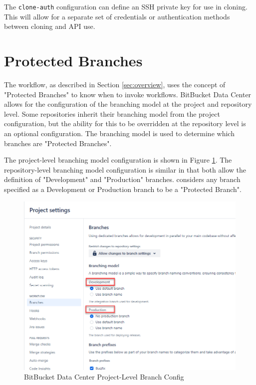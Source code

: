 The \texttt{clone-auth} configuration can define an SSH private key for use in cloning.  This
will allow for a separate set of credentials or authentication methods between cloning and
API use.


\section{Protected Branches}

The \cxoneflow workflow, as described in Section \ref{sec:overview}, uses the concept of "Protected Branches"
to know when to invoke workflows.  BitBucket Data Center allows for the configuration of the branching model
at the project and repository level.  Some repositories inherit their branching model from the project
configuration, but the ability for this to be overridden at the repository level is an optional configuration.
The branching model is used to determine which branches are "Protected Branches".

The project-level branching model configuration is shown in Figure \ref{fig:bbdc-branch-config}.  The
repository-level branching model configuration is similar in that both allow the definition of
"Development" and "Production" branches.  \cxoneflow considers any branch specified as a Development
or Production branch to be a "Protected Branch".

\begin{figure}[h]
    \includegraphics[width=\textwidth]{graphics/bbdc-branch-config.png}
    \caption{BitBucket Data Center Project-Level Branch Config}
    \label{fig:bbdc-branch-config}
\end{figure}


